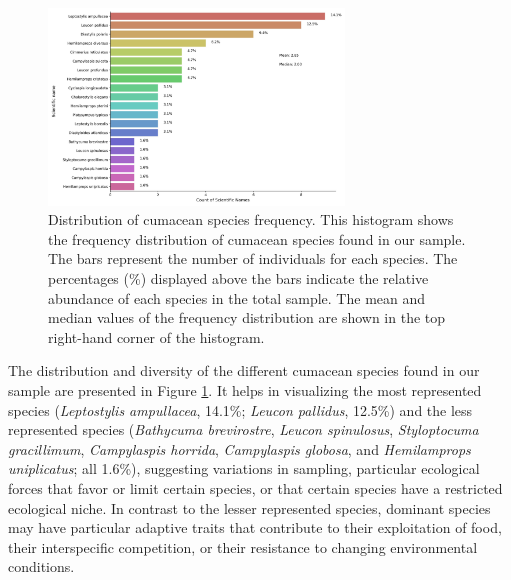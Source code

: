 \begin{figure}[htbp]
    \centering
    \includegraphics[width=0.7\textwidth]{figure2.jpg}
    \caption{Distribution of cumacean species frequency. This histogram shows the frequency distribution of cumacean species found in our sample. The bars represent the number of individuals for each species. The percentages (\%) displayed above the bars indicate the relative abundance of each species in the total sample. The mean and median values of the frequency distribution are shown in the top right-hand corner of the histogram. \label{fig:fig2}}
\end{figure}

The distribution and diversity of the different cumacean species found in our sample are presented in Figure \ref{fig:fig2}. It helps in visualizing the most represented species (\emph{Leptostylis ampullacea}, 14.1\%; \emph{Leucon pallidus}, 12.5\%) and the less represented species (\emph{Bathycuma brevirostre}, \emph{Leucon spinulosus}, \emph{Styloptocuma gracillimum}, \emph{Campylaspis horrida}, \emph{Campylaspis globosa}, and \emph{Hemilamprops uniplicatus}; all 1.6\%), suggesting variations in sampling, particular ecological forces that favor or limit certain species, or that certain species have a restricted ecological niche. In contrast to the lesser represented species, dominant species may have particular adaptive traits that contribute to their exploitation of food, their interspecific competition, or their resistance to changing environmental conditions.

